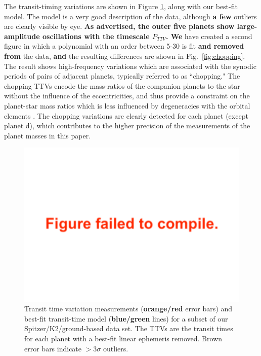 \documentclass[twocolumn]{aastex63}
\begin{document}
The transit-timing variations are shown in Figure \ref{fig:T1_TTVs}, along
with our best-fit model.  The model is a very good description of the data,
although \textbf{a few} outliers are clearly visible by eye.  \textbf{As
advertised, the outer five planets show large-amplitude oscillations with
the timescale $P_{TTV}$.  We} 
have created a second figure in which a polynomial with an order between 5-30 
is fit \textbf{and removed from} the data, \textbf{and} the resulting differences
are shown in Fig.\ \ref{fig:chopping}.  The result shows high-frequency variations which are
associated with the synodic periods of pairs of adjacent planets, typically
referred to as ``chopping."  The chopping TTVs encode the mass-ratios of
the companion planets to the star without the influence of the eccentricities,
and thus provide a constraint on the planet-star mass ratios which is less
influenced by degeneracies with the orbital elements \citep{Deck2015}.  The
chopping variations are clearly detected for each planet
(except planet d), which contributes to the higher
precision of the measurements of the planet
masses in this paper.

\begin{figure}
    \includegraphics[width=0.95\hsize]{figures/T1_ttvs_4panel_stacked.pdf}
    {Transit time variation measurements (\textbf{orange/red} error bars) and best-fit
        transit-time model (\textbf{blue/green} lines) for a subset of our
        Spitzer/K2/ground-based data set.  The TTVs are the transit times for each planet
        with a best-fit linear ephemeris removed.  Brown error bars indicate $>3\sigma$ outliers.  %
}
    \label{fig:T1_TTVs}
\end{figure}
\end{document}
